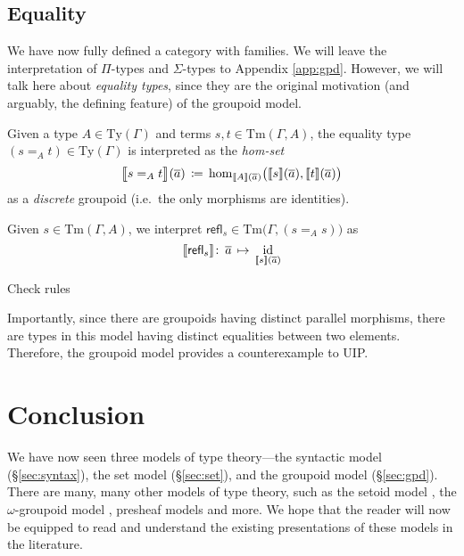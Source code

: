 \documentclass{article}
\theoremstyle{definition}
\renewcommand{\int}[1]{\mathopen{}\left\llbracket #1
    \right\rrbracket\mathclose{}}       %
\newcommand{\refl}{\mathsf{refl}}
\newcommand{\Ty}{\mathrm{Ty}}
\newcommand{\Tm}{\mathrm{Tm}}
\renewcommand{\hom}[3][]{\mathrm{hom}_{#1}\mathopen{}\left( #2, #3 \right)\mathclose{}}
\DeclareMathOperator{\id}{id}				    %
\newcommand{\defeq}{
	\mathrel{\mathrel{\mathop:}\mkern-1.2mu=}}	%
\newcommand{\tup}[1]{\overline{\smash{#1}\vphantom{a}}}
\newcommand{\n}{%
}                %
\begin{document}
\subsection{Equality}
\label{sec:gpd-eq}

We have now fully defined a category with families. We will leave the interpretation of $\Pi$-types and $\Sigma$-types to Appendix \ref{app:gpd}. However, we will talk here about \textit{equality types}, since they are the original motivation (and arguably, the defining feature) of the groupoid model.

Given a type $A \in \Ty(\Gamma)$ and terms $s, t \in \Tm(\Gamma, A)$, the equality type $(s =_A t) \in \Ty(\Gamma)$ is interpreted as the \textit{hom-set}
$$\int{\big.s =_A t}\n(\tup{a})\, \defeq\, \hom[\int{A}(\tup{a})]{\big.\int{s}(\tup{a})}{\int{t}(\tup{a})}$$
as a \textit{discrete} groupoid (i.e.\ the only morphisms are identities).

Given $s \in \Tm(\Gamma,A)$, we interpret $\refl_s \in \Tm\big(\Gamma, (s =_A s) \big)$ as $$\int{\refl_s}\colon\, \tup{a}\, \mapsto\, \id_{\int{s}(\tup{a})}$$

{\color{red} Check rules}

Importantly, since there are groupoids having distinct parallel morphisms, there are types in this model having distinct equalities between two elements. Therefore, the groupoid model provides a counterexample to UIP.


\section{Conclusion}

We have now seen three models of type theory---the syntactic model (\S\ref{sec:syntax}), the set model (\S\ref{sec:set}), and the groupoid model (\S\ref{sec:gpd}). There are many, many other models of type theory, such as the setoid model \cite{setoid}, the $\omega$-groupoid model \cite{om-gpoid}, presheaf models \cite{huber} and more. We hope that the reader will now be equipped to read and understand the existing presentations of these models in the literature.
\end{document}
